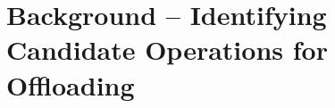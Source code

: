 \section{Background -- Identifying Candidate Operations for Offloading}
\label{sec:background}



\blindtext[3]

\newpage